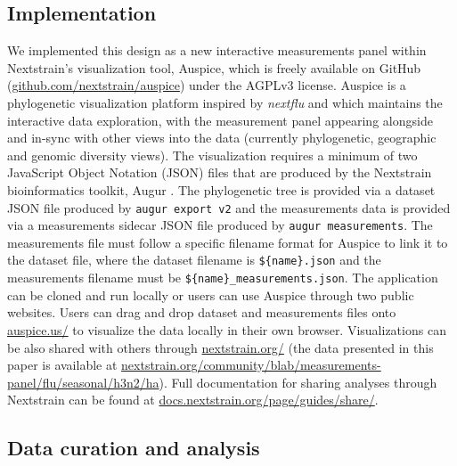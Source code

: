\documentclass[utf8]{FrontiersinHarvard} %
\begin{document}
\subsection{Implementation}

We implemented this design as a new interactive measurements panel within Nextstrain's visualization tool, Auspice, which is freely available on GitHub (\href{https://github.com/nextstrain/auspice}{github.com/nextstrain/auspice}) under the AGPLv3 license.
Auspice is a phylogenetic visualization platform inspired by \emph{nextflu} and which maintains the interactive data exploration, with the measurement panel appearing alongside and in-sync with other views into the data (currently phylogenetic, geographic and genomic diversity views).
The visualization requires a minimum of two JavaScript Object Notation (JSON) files that are produced by the Nextstrain bioinformatics toolkit, Augur \citep{Huddleston2021}.
The phylogenetic tree is provided via a dataset JSON file produced by \texttt{augur export v2} and the measurements data is provided via a measurements sidecar JSON file produced by \texttt{augur measurements}.
The measurements file must follow a specific filename format for Auspice to link it to the dataset file, where the dataset filename is \texttt{\$\{name\}.json} and the measurements filename must be \texttt{\$\{name\}\_measurements.json}.
The application can be cloned and run locally or users can use Auspice through two public websites.
Users can drag and drop dataset and measurements files onto \href{https://auspice.us/}{auspice.us/} to visualize the data locally in their own browser.
Visualizations can be also shared with others through \href{https://nextstrain.org/}{nextstrain.org/} (the data presented in this paper is available at \href{https://nextstrain.org/community/blab/measurements-panel/flu/seasonal/h3n2/ha}{nextstrain.org/community/blab/measurements-panel/flu/seasonal/h3n2/ha}).
Full documentation for sharing analyses through Nextstrain can be found at \href{https://docs.nextstrain.org/page/guides/share/}{docs.nextstrain.org/page/guides/share/}.

\subsection{Data curation and analysis}
\end{document}
